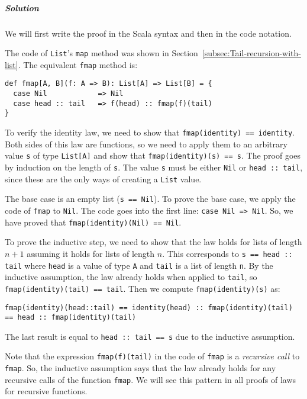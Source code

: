 \subparagraph{Solution}

We will first write the proof in the Scala syntax and then in the
code notation.

The code of \lstinline!List!\textsf{'}s \lstinline!map! method was shown
in Section~\ref{subsec:Tail-recursion-with-list}. The equivalent
\lstinline!fmap! method is:
\begin{lstlisting}
def fmap[A, B](f: A => B): List[A] => List[B] = {
  case Nil            => Nil
  case head :: tail   => f(head) :: fmap(f)(tail)
}
\end{lstlisting}

To verify the identity law, we need to show that \lstinline!fmap(identity) == identity!.
Both sides of this law are functions, so we need to apply them to
an arbitrary value \lstinline!s! of type \lstinline!List[A]! and
show that \lstinline!fmap(identity)(s) == s!. The proof goes by induction
on the length of \lstinline!s!. The value \lstinline!s! must be
either \lstinline!Nil! or \lstinline!head :: tail!, since these
are the only ways of creating a \lstinline!List! value.

The base case is an empty list (\lstinline!s == Nil!). To prove the
base case, we apply the code of \lstinline!fmap! to \lstinline!Nil!.
The code goes into the first line: \lstinline!case Nil => Nil!. So,
we have proved that \lstinline!fmap(identity)(Nil) == Nil!.

To prove the inductive step, we need to show that the law holds for
lists of length $n+1$ assuming it holds for lists of length $n$.
This corresponds to \lstinline!s == head :: tail! where \lstinline!head!
is a value of type \lstinline!A! and \lstinline!tail! is a list
of length \lstinline!n!. By the inductive assumption, the law already
holds when applied to \lstinline!tail!, so \lstinline!fmap(identity)(tail) == tail!.
Then we compute \lstinline!fmap(identity)(s)! as:
\begin{lstlisting}
fmap(identity)(head::tail) == identity(head) :: fmap(identity)(tail) == head :: fmap(identity)(tail)
\end{lstlisting}
The last result is equal to \lstinline!head :: tail == s! due to
the inductive assumption.

Note that the expression \lstinline!fmap(f)(tail)! in the code of
\lstinline!fmap! is a \emph{recursive call} to \lstinline!fmap!.
So, the inductive assumption says that the law already holds for any
recursive calls of the function \lstinline!fmap!. We will see this
pattern in all proofs of laws for recursive functions.

